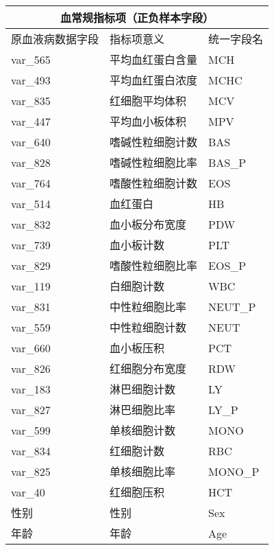 \documentclass[UTF8,a4paper,12pt, onecolumn]{ctexart}
\begin{document}
\begin{table}
\centering
\begin{tabular}{|l|l|l|}
\toprule
\multicolumn{3}{|c|}{血常规指标项（正负样本字段）} \\
\midrule
原血液病数据字段	&	指标项意义	&	统一字段名 \\
\midrule
var\_565	 & 	平均血红蛋白含量	 & 	MCH	\\
var\_493	 & 	平均血红蛋白浓度	 & 	MCHC	\\
var\_835	 & 	红细胞平均体积	 & 	MCV	\\
var\_447	 & 	平均血小板体积	 & 	MPV	\\
var\_640	 & 	嗜碱性粒细胞计数	 & 	BAS	\\
var\_828	 & 	嗜碱性粒细胞比率	 & 	BAS\_P	\\
var\_764	 & 	嗜酸性粒细胞计数	 & 	EOS	\\
var\_514	 & 	血红蛋白	 & 	HB	\\
var\_832	 & 	血小板分布宽度	 & 	PDW	\\
var\_739	 & 	血小板计数	 & 	PLT	\\
var\_829	 & 	嗜酸性粒细胞比率	 & 	EOS\_P	\\
var\_119	 & 	白细胞计数	 & 	WBC	\\
var\_831	 & 	中性粒细胞比率	 & 	NEUT\_P	\\
var\_559	 & 	中性粒细胞计数	 & 	NEUT	\\
var\_660	 & 	血小板压积	 & 	PCT	\\
var\_826	 & 	红细胞分布宽度	 & 	RDW	\\
var\_183	 & 	淋巴细胞计数	 & 	LY	\\
var\_827	 & 	淋巴细胞比率	 & 	LY\_P	\\
var\_599	 & 	单核细胞计数	 & 	MONO	\\
var\_834	 & 	红细胞计数	 & 	RBC	\\
var\_825	 & 	单核细胞比率	 & 	MONO\_P	\\
var\_40	 & 	红细胞压积	 & 	HCT	\\
性别	 & 	性别	 & 	Sex	\\
年龄	 & 	年龄	 & 	Age \\
\bottomrule
\end{tabular}
\end{table}
\end{document}
